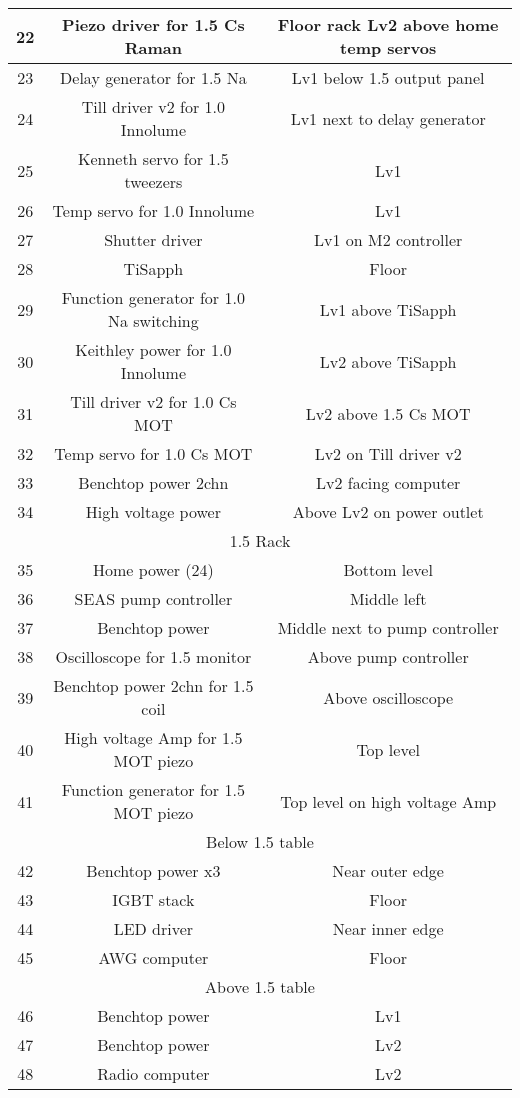 \documentclass[10pt,fleqn,twocolumn]{article}
\begin{document}
\begin{longtable}{|c|c|c|}
  22&Piezo driver for 1.5 Cs Raman&Floor rack Lv2 above home temp servos\\\hline
  23&Delay generator for 1.5 Na&Lv1 below 1.5 output panel\\\hline
  24&Till driver v2 for 1.0 Innolume&Lv1 next to delay generator\\\hline
  25&Kenneth servo for 1.5 tweezers&Lv1\\\hline
  26&Temp servo for 1.0 Innolume&Lv1\\\hline
  27&Shutter driver&Lv1 on M2 controller\\\hline
  28&TiSapph&Floor\\\hline
  29&Function generator for 1.0 Na switching&Lv1 above TiSapph\\\hline
  30&Keithley power for 1.0 Innolume&Lv2 above TiSapph\\\hline
  31&Till driver v2 for 1.0 Cs MOT&Lv2 above 1.5 Cs MOT\\\hline
  32&Temp servo for 1.0 Cs MOT&Lv2 on Till driver v2\\\hline
  33&Benchtop power 2chn&Lv2 facing computer\\\hline
  34&High voltage power&Above Lv2 on power outlet\\\hline
  \multicolumn{3}{|c|}{1.5 Rack}\\\hline
  35&Home power (24)&Bottom level\\\hline
  36&SEAS pump controller&Middle left\\\hline
  37&Benchtop power&Middle next to pump controller\\\hline
  38&Oscilloscope for 1.5 monitor&Above pump controller\\\hline
  39&Benchtop power 2chn for 1.5 coil&Above oscilloscope\\\hline
  40&High voltage Amp for 1.5 MOT piezo&Top level\\\hline
  41&Function generator for 1.5 MOT piezo&Top level on high voltage Amp\\\hline
  \multicolumn{3}{|c|}{Below 1.5 table}\\\hline
  42&Benchtop power x3&Near outer edge\\\hline
  43&IGBT stack&Floor\\\hline
  44&LED driver&Near inner edge\\\hline
  45&AWG computer&Floor\\\hline
  \multicolumn{3}{|c|}{Above 1.5 table}\\\hline
  46&Benchtop power&Lv1\\\hline
  47&Benchtop power&Lv2\\\hline
  48&Radio computer&Lv2\\\hline
\end{longtable}
\twocolumn
\end{document}
